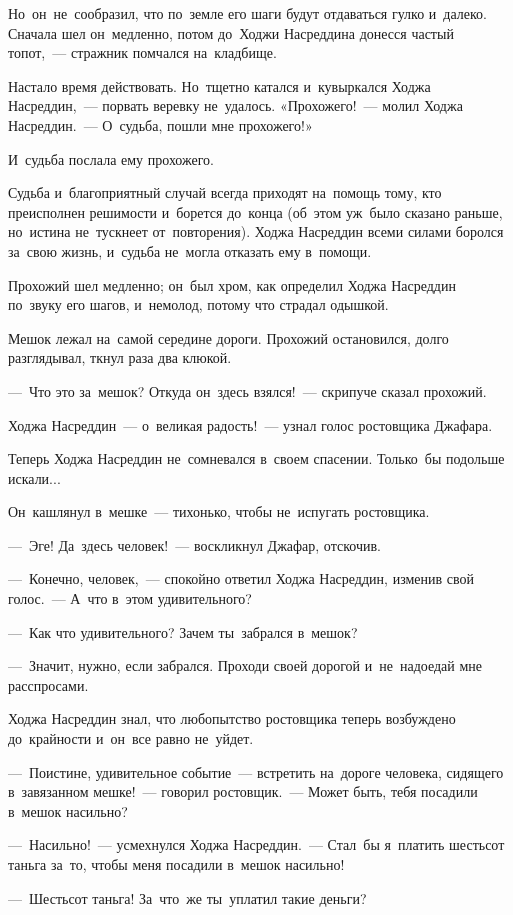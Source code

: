 \documentclass[12pt,a4paper]{book}
\begin{document}
Но~он~не~сообразил, что по~земле его шаги будут отдаваться гулко и~далеко. Сначала шел он~медленно, потом до~Ходжи Насреддина донесся частый топот,~— стражник помчался на~кладбище.

Настало время действовать. Но~тщетно катался и~кувыркался Ходжа Насреддин,~— порвать веревку не~удалось. «Прохожего!~— молил Ходжа Насреддин.~— О~судьба, пошли мне прохожего!»

И~судьба послала ему прохожего.

Судьба и~благоприятный случай всегда приходят на~помощь тому, кто преисполнен решимости и~борется до~конца (об~этом уж~было сказано раньше, но~истина не~тускнеет от~повторения). Ходжа Насреддин всеми силами боролся за~свою жизнь, и~судьба не~могла отказать ему в~помощи.

Прохожий шел медленно; он~был хром, как определил Ходжа Насреддин по~звуку его шагов, и~немолод, потому что страдал одышкой.

Мешок лежал на~самой середине дороги. Прохожий остановился, долго разглядывал, ткнул раза два клюкой.

—~Что это за~мешок? Откуда он~здесь взялся!~— скрипуче сказал прохожий.

Ходжа Насреддин~— о~великая радость!~— узнал голос ростовщика Джафара.

Теперь Ходжа Насреддин не~сомневался в~своем спасении. Только~бы подольше искали...

Он~кашлянул в~мешке~— тихонько, чтобы не~испугать ростовщика.

—~Эге! Да~здесь человек!~— воскликнул Джафар, отскочив.

—~Конечно, человек,~— спокойно ответил Ходжа Насреддин, изменив свой голос.~— А~что в~этом удивительного?

—~Как что удивительного? Зачем ты~забрался в~мешок?

—~Значит, нужно, если забрался. Проходи своей дорогой и~не~надоедай мне расспросами.

Ходжа Насреддин знал, что любопытство ростовщика теперь возбуждено до~крайности и~он~все равно не~уйдет.

—~Поистине, удивительное событие~— встретить на~дороге человека, сидящего в~завязанном мешке!~— говорил ростовщик.~— Может быть, тебя посадили в~мешок насильно?

—~Насильно!~— усмехнулся Ходжа Насреддин.~— Стал~бы я~платить шестьсот таньга за~то, чтобы меня посадили в~мешок насильно!

—~Шестьсот таньга! За~что~же ты~уплатил такие деньги?
\end{document}
